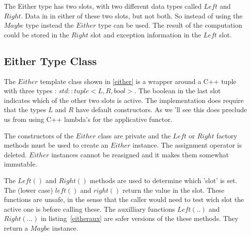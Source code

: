 \documentclass[12pt,fleqn]{article}
\begin{document}
The Either type has two slots, with two different data types called $Left$ and $Right$. 
Data in in either of these two slots, but not both.
So instead of using the $Maybe$ type instead the $Either$ type can be used. 
The result of the computation could be stored in the $Right$ slot and exception information in the $Left$ slot.

\subsection{Either Type Class}
%
%
%

The $Either$ template class shown in \ref{either} is a wrapper around a C++ tuple with three types : $std::tuple<L,R,bool>$.
The boolean in the last slot indicates which of the other two slots is active.
The implementation does require that the types $L$ and $R$ have default constructors.
As we 'll see this does preclude us from using C++ lambda's for the applicative functor.

The constructors of the $Either$ class are private and the $Left$ or $Right$ factory methods must be used to create an $Either$ instance.
The assignment operator is deleted. 
$Either$ instances cannot be reasigned and it makes them somewhat immutable.

The $Left()$ and $Right()$ methods are used to determine which 'slot' is set.
The (lower case) $left()$ and $right()$ return the value in the slot.
These functions are unsafe, in the sense that the caller would need to test wich slot the active one is before calling these.
The auxilliary functions $Left(..)$ and $Right(...)$ in listing~\ref{eitheraux} are safer versions of the these methods.
They return a $Maybe$ instance.
\end{document}
